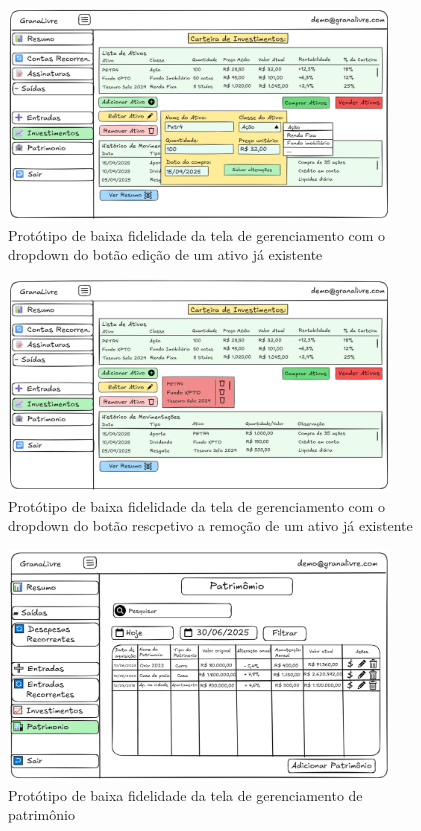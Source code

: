 \begin{figure}[H]
    \centering
    \includegraphics[width=0.9\textwidth]{imgs/08-investimentos_4.png}
    \caption{Protótipo de baixa fidelidade da tela de gerenciamento com o dropdown do botão edição de um ativo já existente}
    \label{fig:prot_investimentos5}
\end{figure}

\begin{figure}[H]
    \centering
    \includegraphics[width=0.9\textwidth]{imgs/08-investimentos_5.png}
    \caption{Protótipo de baixa fidelidade da tela de gerenciamento com o dropdown do botão rescpetivo a remoção de um ativo já existente}
    \label{fig:prot_investimentos6}
\end{figure}

\begin{figure}[H]
    \centering
    \includegraphics[width=0.9\textwidth]{imgs/09-patrimonio.png}
    \caption{Protótipo de baixa fidelidade da tela de gerenciamento de patrimônio}
    \label{fig:prot_patrimonio}
\end{figure}

